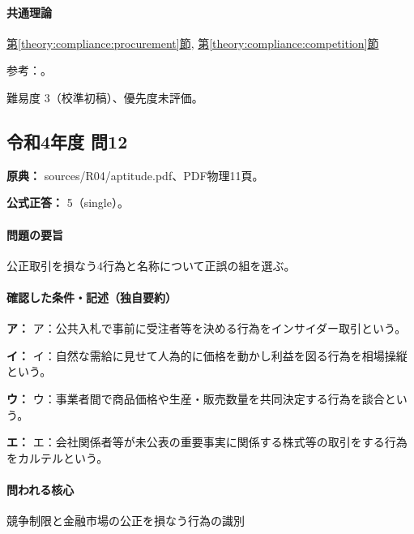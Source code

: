 \paragraph{共通理論} \hyperref[theory:compliance:procurement]{第\ref*{theory:compliance:procurement}節}, \hyperref[theory:compliance:competition]{第\ref*{theory:compliance:competition}節}

\par 参考：\cite{mof_procurement2006,jftc_rules,jftc_kansei,jftc_private2018}。

\par 難易度 3（校準初稿）、優先度未評価。

\subsection{令和4年度 問12}
\label{q:r04-reg-apt-12}

\noindent\textbf{原典：} sources/R04/aptitude.pdf、PDF物理11頁。

\textbf{公式正答：} 5（single）。

\paragraph{問題の要旨} 公正取引を損なう4行為と名称について正誤の組を選ぶ。

\paragraph{確認した条件・記述（独自要約）}\mbox{}\par

\noindent\textbf{ア：} ア：公共入札で事前に受注者等を決める行為をインサイダー取引という。\par

\noindent\textbf{イ：} イ：自然な需給に見せて人為的に価格を動かし利益を図る行為を相場操縦という。\par

\noindent\textbf{ウ：} ウ：事業者間で商品価格や生産・販売数量を共同決定する行為を談合という。\par

\noindent\textbf{エ：} エ：会社関係者等が未公表の重要事実に関係する株式等の取引をする行為をカルテルという。\par

\paragraph{問われる核心} 競争制限と金融市場の公正を損なう行為の識別

